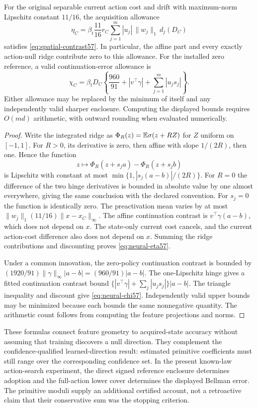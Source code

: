 \begin{proposition}\label{prop:moduli57}
For the original separable current action cost and drift with maximum-norm Lipschitz constant $11/16$, the acquisition allowance
\begin{equation}\label{eq:neural-eta57}
 \eta_C=\beta_t\frac{11}{16}r_C
       \sum_{j=1}^{m}|u_j|\,\|w_j\|_1\,d_j(D_C)
\end{equation}
satisfies \eqref{eq:spatial-contrast57}. In particular, the affine part and every exactly action-null ridge contribute zero to this allowance. For the installed zero reference, a valid continuation-error allowance is
\begin{equation}\label{eq:neural-chi57}
 \chi_C=\beta_tD_C\left\{\frac{960}{91}
               +|v^\top\gamma|+\sum_{j=1}^{m}|u_js_j|\right\}.
\end{equation}
Either allowance may be replaced by the minimum of itself and any independently valid sharper enclosure. Computing the displayed bounds requires $O(md)$ arithmetic, with outward rounding when evaluated numerically.
\end{proposition}
\begin{proof}
Write the integrated ridge as $\Phi_R(z)=\mathbb E\sigma(z+RZ)$ for $Z$ uniform on $[-1,1]$. For $R>0$, its derivative is zero, then affine with slope $1/(2R)$, then one. Hence the function
\[
 z\longmapsto\Phi_R(z+s_ja)-\Phi_R(z+s_jb)
\]
is Lipschitz with constant at most $\min\{1,|s_j(a-b)|/(2R)\}$. For $R=0$ the difference of the two hinge derivatives is bounded in absolute value by one almost everywhere, giving the same conclusion with the declared convention. For $s_j=0$ the function is identically zero. The preactivation mean varies by at most $\|w_j\|_1(11/16)\|x-x_C\|_\infty$. The affine continuation contrast is $v^\top\gamma(a-b)$, which does not depend on $x$. The state-only current cost cancels, and the current action-cost difference also does not depend on $x$. Summing the ridge contributions and discounting proves \eqref{eq:neural-eta57}.

Under a common innovation, the zero-policy continuation contrast is bounded by $(1920/91)\|\gamma\|_\infty|a-b|=(960/91)|a-b|$. The one-Lipschitz hinge gives a fitted continuation contrast bound $\{|v^\top\gamma|+\sum_j|u_js_j|\}|a-b|$. The triangle inequality and discount give \eqref{eq:neural-chi57}. Independently valid upper bounds may be minimized because each bounds the same nonnegative quantity. The arithmetic count follows from computing the feature projections and norms.
\end{proof}

These formulas connect feature geometry to acquired-state accuracy without assuming that training discovers a null direction. They complement the confidence-qualified learned-direction result: estimated primitive coefficients must still range over the corresponding confidence set. In the present known-law action-search experiment, the direct signed reference enclosure determines adoption and the full-action lower cover determines the displayed Bellman error. The primitive moduli supply an additional certified account, not a retroactive claim that their conservative sum was the stopping criterion.
